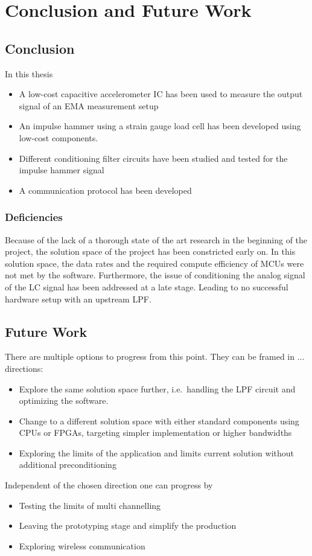\chapter{Conclusion and Future Work}

\section{Conclusion}
In this thesis
\begin{itemize}
    \item A low-cost capacitive accelerometer \ac{IC} has been used to measure the output signal of an \ac{EMA} measurement setup
    \item An impulse hammer using a strain gauge load cell has been developed using low-cost components.
    \item Different conditioning filter circuits have been studied and tested for the impulse hammer signal
    \item A communication protocol has been developed
\end{itemize}

\subsection{Deficiencies}
Because of the lack of a thorough state of the art research in the beginning of the project, the solution space of the project has been constricted early on. In this solution space, the data rates and the required compute efficiency of \ac{MCU}s were not met by the software. Furthermore, the issue of conditioning the analog signal of the \ac{LC} signal has been addressed at a late stage. Leading to no successful hardware setup with an upstream \ac{LPF}.

\newpage
\section{Future Work}
There are multiple options to progress from this point. They can be framed in ... directions:
\begin{itemize}
    \item Explore the same solution space further, i.e.\ handling the \ac{LPF} circuit and optimizing the software.
    \item Change to a different solution space with either standard components using \ac{CPU}s or \ac{FPGA}s, targeting simpler implementation or higher bandwidths
    \item Exploring the limits of the application and limits current solution without additional preconditioning
\end{itemize}

Independent of the chosen direction one can progress by
\begin{itemize}
    \item Testing the limits of multi channelling
    \item Leaving the prototyping stage and simplify the production
    \item Exploring wireless communication
\end{itemize}

